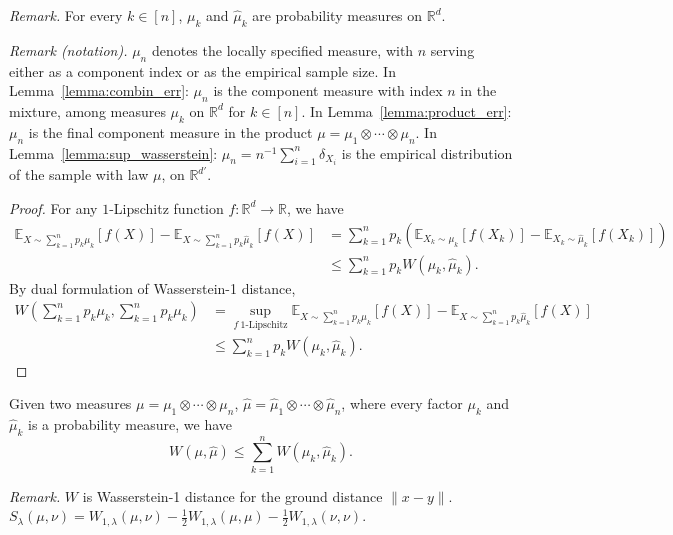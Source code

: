 \noindent\textit{Remark.} For every $k\in[n]$, $\mu_k$ and $\hat\mu_k$ are probability measures on $\mathbb R^d$.

\noindent\textit{Remark (notation).} $\mu_n$ denotes the locally specified measure, with $n$ serving either as a component index or as the empirical sample size. In Lemma~\ref{lemma:combin_err}: $\mu_n$ is the component measure with index $n$ in the mixture, among measures $\mu_k$ on $\mathbb{R}^d$ for $k\in[n]$. In Lemma~\ref{lemma:product_err}: $\mu_n$ is the final component measure in the product $\mu=\mu_1\otimes\cdots\otimes\mu_n$. In Lemma~\ref{lemma:sup_wasserstein}: $\mu_n=n^{-1}\sum_{i=1}^n\delta_{X_i}$ is the empirical distribution of the sample with law $\mu$, on $\mathbb{R}^{d'}$.

    \begin{proof}
    For any $ 1$-Lipschitz function $ f:\mathbb{R}^{d}\rightarrow \mathbb{R}$, we have 
    \begin{align*}
    \mathbb{E}_{X\sim \sum _{k=1}^{n} p_{k} \mu _{k}}[ f( X)] -\mathbb{E}_{X\sim \sum _{k=1}^{n} p_{k}\hat{\mu }_{k}}[ f( X)] & =\sum _{k=1}^{n} p_{k}(\mathbb{E}_{X_{k} \sim \mu _{k}}[ f( X_{k})] -\mathbb{E}_{X_{k} \sim \hat{\mu }_{k}}[ f( X_{k})])\\
     & \leqslant \sum _{k=1}^{n} p_{k} W( \mu _{k} ,\hat{\mu }_{k}) .
    \end{align*}
    By dual formulation of Wasserstein-1 distance, 
    \begin{align*}
    W\left(\sum _{k=1}^{n} p_{k} \mu _{k} ,\sum _{k=1}^{n} p_{k} \mu _{k}\right) & =\sup _{f\ \text{1-Lipschitz}}\mathbb{E}_{X\sim \sum _{k=1}^{n} p_{k} \mu _{k}}[ f( X)] -\mathbb{E}_{X\sim \sum _{k=1}^{n} p_{k}\hat{\mu }_{k}}[ f( X)]\\
     & \leqslant \sum _{k=1}^{n} p_{k} W( \mu _{k} ,\hat{\mu }_{k}) .
    \end{align*}
    \end{proof}

    \begin{lemma}\label{lemma:product_err}
Given two measures $\mu=\mu_1\otimes\cdots\otimes\mu_n$, $\hat\mu=\hat\mu_1\otimes\cdots\otimes\hat\mu_n$, where every factor $\mu_k$ and $\hat\mu_k$ is a probability measure, we have
\begin{equation*}
W(\mu,\hat\mu)\leqslant\sum_{k=1}^n W(\mu_k,\hat\mu_k).
\end{equation*}
      \end{lemma}

\noindent\textit{Remark.} $W$ is Wasserstein-1 distance for the ground distance $\|x-y\|$. $S_\lambda(\mu,\nu)=W_{1,\lambda}(\mu,\nu)-\tfrac12W_{1,\lambda}(\mu,\mu)-\tfrac12W_{1,\lambda}(\nu,\nu)$.

